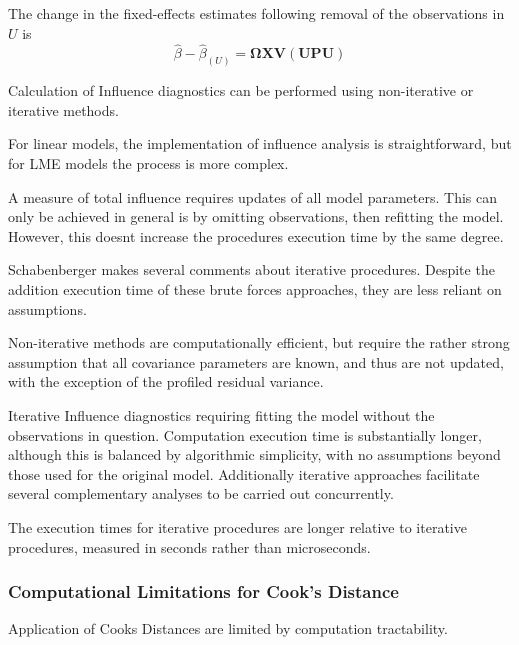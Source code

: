 \documentclass[12pt, a4paper]{report}
\theoremstyle{plain}
\theoremstyle{definition}
\theoremstyle{remark}
\begin{document}



The change in the fixed-effects estimates following removal of the observations in $U$ is
\[ \hat{\beta} - \hat{\beta}_{(U)} = \boldsymbol{\Omega}\boldsymbol{X}\boldsymbol{V}
\left( \boldsymbol{U} \boldsymbol{P}\boldsymbol{U}\right)   \]

Calculation of Influence diagnostics can be performed using non-iterative or iterative methods.

For linear models, the implementation of influence analysis is straightforward, but for LME models the process is more complex.


A measure of total influence requires updates of all model parameters. This can only be achieved in general is by omitting observations, then refitting the model.
However, this doesnt increase the procedures execution time by the same degree.





Schabenberger makes several comments about iterative procedures. Despite the addition execution time of these brute forces 
approaches, they are less reliant on assumptions.


Non-iterative methods are computationally efficient, but require the rather strong assumption that all 
covariance parameters are known, and thus are not updated, with the exception of the profiled residual variance.

Iterative Influence diagnostics requiring fitting the model without the observations in question. Computation execution time is substantially longer, although this is balanced by algorithmic 
simplicity, with no assumptions beyond those used for the original model. Additionally iterative approaches facilitate several complementary analyses to be carried out 
concurrently.

The execution times for iterative procedures are longer relative to iterative procedures, measured in seconds rather than microseconds. 



\subsubsection{Computational Limitations for Cook's Distance}
Application of Cooks Distances are limited by computation tractability.
\end{document}
